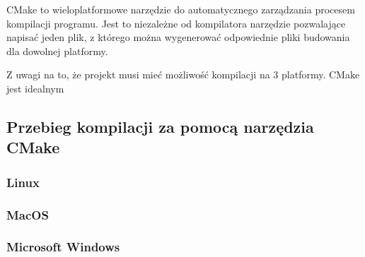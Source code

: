 \par
CMake to wieloplatformowe narzędzie do automatycznego zarządzania procesem kompilacji programu.
Jest to niezależne od kompilatora narzędzie pozwalające napisać jeden plik, z którego można wygenerować odpowiednie pliki budowania dla dowolnej platformy.
\par
Z uwagi na to, że projekt musi mieć możliwość kompilacji na 3 platformy.
CMake jest idealnym 

\subsection{Przebieg kompilacji za pomocą narzędzia CMake}

\subsubsection{Linux}

\subsubsection{MacOS}

\subsubsection{Microsoft Windows}